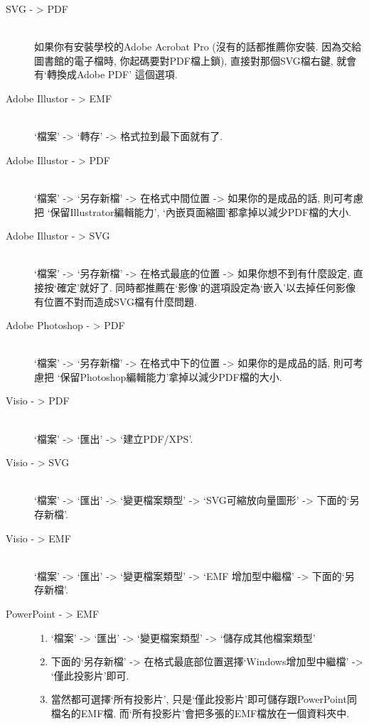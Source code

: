 \begin{description}
  \item[SVG - > PDF] \hfill\\
    如果你有安裝學校的Adobe Acrobat Pro (沒有的話都推薦你安裝. 因為交給圖書館的電子檔時, 你起碼要對PDF檔上鎖), 直接對那個SVG檔右鍵, 就會有`轉換成Adobe PDF' 這個選項.

  \item[Adobe Illustor - > EMF] \hfill\\
    `檔案' -> `轉存' -> 格式拉到最下面就有了.

  \item[Adobe Illustor - > PDF] \hfill\\
    `檔案' -> `另存新檔' -> 在格式中間位置 -> 如果你的是成品的話, 則可考慮把 `保留Illustrator編輯能力', `內嵌頁面縮圖'都拿掉以減少PDF檔的大小.

  \item[Adobe Illustor - > SVG] \hfill\\
    `檔案' -> `另存新檔' -> 在格式最底的位置 -> 如果你想不到有什麼設定, 直接按`確定'就好了. 同時都推薦在`影像'的選項設定為`嵌入'以去掉任何影像有位置不對而造成SVG檔有什麼問題.

  \item[Adobe Photoshop - > PDF] \hfill\\
    `檔案' -> `另存新檔' -> 在格式中下的位置 -> 如果你的是成品的話, 則可考慮把 `保留Photoshop編輯能力'拿掉以減少PDF檔的大小.

  \item[Visio - > PDF] \hfill\\
    `檔案' -> `匯出' -> `建立PDF/XPS'.

  \item[Visio - > SVG] \hfill\\
    `檔案' -> `匯出' -> `變更檔案類型' -> `SVG可縮放向量圖形' -> 下面的`另存新檔'.

  \item[Visio - > EMF] \hfill\\
    `檔案' -> `匯出' -> `變更檔案類型' -> `EMF 增加型中繼檔' -> 下面的`另存新檔'.

  \newpage
  \item[PowerPoint - > EMF] \hfill
    \begin{enumerate}
      \item `檔案' -> `匯出' -> `變更檔案類型' -> `儲存成其他檔案類型'
      \item 下面的`另存新檔' -> 在格式最底部位置選擇`Windows增加型中繼檔' -> `僅此投影片'即可.
      \item 當然都可選擇`所有投影片', 只是`僅此投影片'即可儲存跟PowerPoint同檔名的EMF檔. 而`所有投影片'會把多張的EMF檔放在一個資料夾中.
    \end{enumerate}


\end{description}
